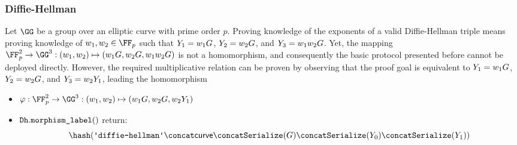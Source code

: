 \documentclass[11pt]{article}
\begin{document}
\subsubsection{Diffie-Hellman}
Let $\GG$ be a group over an elliptic curve with prime order $p$.
Proving knowledge of the exponents of a valid Diffie-Hellman triple means proving knowledge of $\witness_1,\witness_2\in\FF_p$ such that $Y_1=w_1G$, $Y_2=w_2G$, and $Y_3=w_1 w_2 G$.
Yet, the mapping $\FF_p^2\to\GG^3:(\witness_1,\witness_2)\mapsto (\witness_1G,\witness_2G,\witness_1\witness_2G)$ is not a homomorphism, and consequently the basic protocol presented before cannot be deployed directly.
However, the required multiplicative relation can be proven by observing that the proof goal is equivalent to $Y_1=w_1G$, $Y_2=w_2G$, and $Y_3=w_2Y_1$, leading the homomorphism

\begin{itemize}
  \item  $\varphi:\FF_p^2\to\GG^3:(\witness_1,\witness_2)\mapsto(\witness_1G,\witness_2G,\witness_2\statement_1)$
  \item $\texttt{Dh}.\texttt{morphism\_label}()$ return:
  \[
    \hash(\dhlabel \concat \curvectx \concat \serialize(G) \concat \serialize(\statement_0) \concat \serialize(\statement_1))
  \]
\end{itemize}
\end{document}
